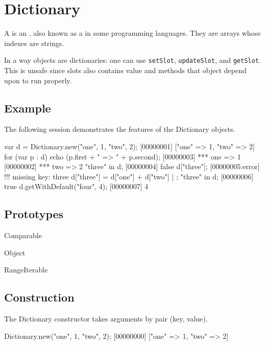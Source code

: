 \section{Dictionary}

A  is an , also known as a
 in some programming languages.  They are arrays whose
indexes are strings.

In a way objects are dictionaries: one can use \lstinline|setSlot|,
\lstinline|updateSlot|, and \lstinline|getSlot|.  This is unsafe since
slots also contains value and methods that object depend upon to run
properly.

\subsection{Example}

The following session demonstrates the features of the Dictionary
objects.

\begin{urbiscript}[firstnumber=1]
var d = Dictionary.new("one", 1, "two", 2);
[00000001] ["one" => 1, "two" => 2]
for (var p : d)
  echo (p.first + " => " + p.second);
[00000003] *** one => 1
[00000002] *** two => 2
"three" in d;
[00000004] false
d["three"];
[00000005:error] !!! missing key: three
d["three"] = d["one"] + d["two"] | {};
"three" in d;
[00000006] true
d.getWithDefault("four", 4);
[00000007] 4
\end{urbiscript}

\subsection{Prototypes}

\begin{refObjects}
\item[Comparable]
\item[Object]
\item[RangeIterable]
\end{refObjects}

\subsection{Construction}

The Dictionary constructor takes arguments by pair (key, value).

\begin{urbiscript}
Dictionary.new("one", 1, "two", 2);
[00000000] ["one" => 1, "two" => 2]
\end{urbiscript}

